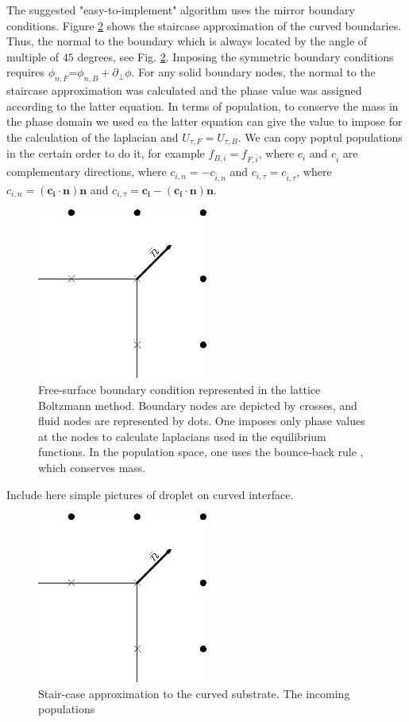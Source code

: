 \documentclass{article}
\begin{document}
The suggested "easy-to-implement" algorithm uses the mirror boundary conditions. Figure \ref{fig:free:surface} shows the staircase approximation of the curved boundaries. 
Thus, the normal to the boundary which
is always located by the angle of multiple of $45$ degrees, see Fig. \ref{fig:free:surface}.  Imposing the
symmetric boundary conditions requires $\phi_{n,F}$=$\phi_{n,B}+\partial_{\perp} \phi$. For any solid boundary nodes, the normal to the staircase approximation was calculated and the phase value was assigned according to the latter equation.  In terms of population, to conserve the mass in the phase domain we used ea  the latter equation can give the value to impose for the calculation of the laplacian and $U_{\tau,F}=U_{\tau,B}$. We can copy poptul
populations in the certain order to do it, for example $f_{B,i}=f_{F,\bar{i}}$, where $c_i$ and
$c_{\bar{i}}$ are complementary directions, where $c_{i,n}=-c_{\bar{i},n}$ and
$c_{i,\tau}=c_{\bar{i},\tau}$, where $c_{i,n}=(\bm{c_i} \cdot \bm{n})\bm{n}$ and
$c_{i,\tau}=\bm{c_i}-(\bm{c_i}\cdot \bm{n})\bm{n}$.  
\begin{figure}
\includegraphics[width=0.5\textwidth]{Figures/free_surface.eps}
\caption{Free-surface boundary condition represented in the lattice Boltzmann method. 
Boundary nodes are depicted by crosses, and fluid nodes are represented by dots. One imposes only phase values at the nodes to calculate laplacians used in the equilibrium functions. In the population space, one uses the bounce-back rule \cite{yu-viscous}, which conserves mass.
\label{fig:free:surface}}
\end{figure}

{\color{red} Include here simple pictures of droplet on curved interface.}
\begin{figure}
\includegraphics[width=0.5\textwidth]{Figures/free_surface.eps}
\caption{Stair-case approximation to the curved substrate. The incoming populations \label{fig:free:surface}}
\end{figure}
\end{document}
